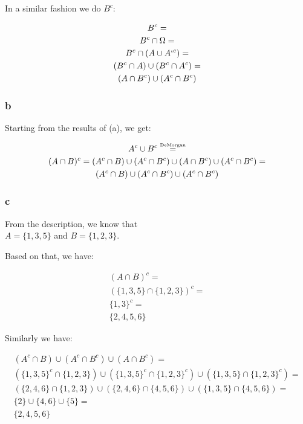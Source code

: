 \documentclass{article}
\begin{document}
In a similar fashion we do $B^{c}$:


\begin{gather*}
    B^{c} = \\
    B^{c} \cap \Omega = \\
    B^{c} \cap (A \cup A`^{c}) = \\
    (B^{c} \cap A) \cup (B^{c} \cap A^{c}) = \\
    (A \cap B^{c}) \cup (A^{c} \cap B^{c})
\end{gather*}

\subsubsection*{b}

Starting from the results of (a), we get:

\begin{gather*}
    A^{c} \cup B^{c} \stackrel{\text{\tiny{DeMorgan}}}{=} \\
    (A \cap B)^{c} = (A^{c} \cap B) \cup (A^{c} \cap B^{c}) \cup (A \cap B^{c}) \cup (A^{c} \cap B^{c}) = \\
    (A^{c} \cap B) \cup (A^{c} \cap B^{c}) \cup (A^{c} \cap B^{c})
\end{gather*}

\subsubsection*{c}

From the description, we know that \\
$A = \{1, 3, 5\}$ and $B = \{1, 2, 3\}$.

Based on that, we have:

\begin{gather*}
    (A \cap B)^{c} = \\
    (\{1, 3, 5\} \cap \{1, 2, 3\})^{c} = \\
    \{1, 3\}^{c} = \\
    \{2, 4, 5, 6\}
\end{gather*}

Similarly we have:

\begin{gather*}
    (A^{c} \cap B) \cup (A^{c} \cap B^{c}) \cup (A \cap B^{c}) = \\
    (\{1, 3, 5\}^{c} \cap \{1, 2, 3\}) \cup (\{1, 3, 5\}^{c} \cap \{1, 2, 3\}^{c}) \cup (\{1, 3, 5\} \cap \{1, 2, 3\}^{c}) = \\
    (\{2, 4, 6\} \cap \{1, 2, 3\}) \cup (\{2, 4, 6\} \cap \{4, 5, 6\}) \cup (\{1, 3, 5\} \cap \{4, 5, 6\}) = \\
    \{2\} \cup \{4, 6\} \cup \{5\} = \\
    \{2, 4, 5, 6\}
\end{gather*}
\end{document}
